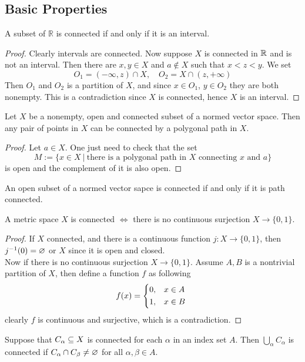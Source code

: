 \subsection{Basic Properties}
\begin{theorem}
A subset of $\mathbb{R}$ is connected if and only if it is an interval.
\end{theorem}
\begin{proof}
Clearly intervals are connected. Now suppose $X$ is connected in $\mathbb{R}$ and is not an interval. Then there are $x,y\in X$ and $a\notin X$ such that $x<z<y$. We set
\[O_1=(-\infty,z)\cap X,\quad O_2=X\cap(z,+\infty)\]
Then $O_1$ and $O_2$ is a partition of $X$, and since $x\in O_1$, $y\in O_2$ they are both nonempty. This is a contradiction since $X$ is connected, hence $X$ is an interval.
\end{proof}
\begin{theorem}
Let $X$ be a nonempty, open and connected subset of a normed vector space. Then any pair of points in $X$ can be connected by a polygonal path in $X$.
\end{theorem}
\begin{proof}
Let $a\in X$. One just need to check that the set
\[M:=\{x\in X\ |\ \text{there is a polygonal path in $X$ connecting $x$ and $a$}\}\]
is open and the complement of it is also open.
\end{proof}
\begin{corollary}
An open subset of a normed vector sapce is connected if and only if it is path connected.
\end{corollary}
\begin{proposition}
A metric space $X$ is connected $\iff$ there is no continuous surjection $X\to \{0,1\}$.
\end{proposition}
\begin{proof}
If $X$ connected, and there is a continuous function $j: X\to \{0,1\}$, then $j^{-1}(0)=\varnothing$ or $X$ since it is open and closed.\\
Now if there is no continuous surjection $X\to \{0,1\}$. Assume $A, B$ is a nontrivial partition of $X$, then define a function $f$ as following
\[f(x)=\begin{cases*}
0, &$x\in A$\\
1, &$x\in B$
\end{cases*}\]
clearly $f$ is continuous and surjective, which is a contradiction.
\end{proof}
\begin{proposition}
Suppose that $C_\alpha\subseteq X$ is connected for each $\alpha$ in an index set $A$. Then $\bigcup_{\alpha}C_\alpha$ is connected if $C_\alpha\cap C_\beta\neq\varnothing$ for all $\alpha,\beta\in A$.
\end{proposition}
